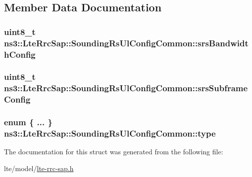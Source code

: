 \subsection{Member Data Documentation}
\subsubsection[{\texorpdfstring{srs\+Bandwidth\+Config}{srsBandwidthConfig}}]{\setlength{\rightskip}{0pt plus 5cm}uint8\+\_\+t ns3\+::\+Lte\+Rrc\+Sap\+::\+Sounding\+Rs\+Ul\+Config\+Common\+::srs\+Bandwidth\+Config}\hypertarget{structns3_1_1LteRrcSap_1_1SoundingRsUlConfigCommon_a075f57098da17d321d2ac57a1f21fd7e}{}\label{structns3_1_1LteRrcSap_1_1SoundingRsUlConfigCommon_a075f57098da17d321d2ac57a1f21fd7e}
\subsubsection[{\texorpdfstring{srs\+Subframe\+Config}{srsSubframeConfig}}]{\setlength{\rightskip}{0pt plus 5cm}uint8\+\_\+t ns3\+::\+Lte\+Rrc\+Sap\+::\+Sounding\+Rs\+Ul\+Config\+Common\+::srs\+Subframe\+Config}\hypertarget{structns3_1_1LteRrcSap_1_1SoundingRsUlConfigCommon_a37f0e375bfa9d07583afa6b7d88223ab}{}\label{structns3_1_1LteRrcSap_1_1SoundingRsUlConfigCommon_a37f0e375bfa9d07583afa6b7d88223ab}
\subsubsection[{\texorpdfstring{type}{type}}]{\setlength{\rightskip}{0pt plus 5cm}enum \{ ... \}   ns3\+::\+Lte\+Rrc\+Sap\+::\+Sounding\+Rs\+Ul\+Config\+Common\+::type}\hypertarget{structns3_1_1LteRrcSap_1_1SoundingRsUlConfigCommon_adc03f36bfe4d4e6164f3be8776203dea}{}\label{structns3_1_1LteRrcSap_1_1SoundingRsUlConfigCommon_adc03f36bfe4d4e6164f3be8776203dea}


The documentation for this struct was generated from the following file\+:\begin{DoxyCompactItemize}
\item 
lte/model/\hyperlink{lte-rrc-sap_8h}{lte-\/rrc-\/sap.\+h}\end{DoxyCompactItemize}
